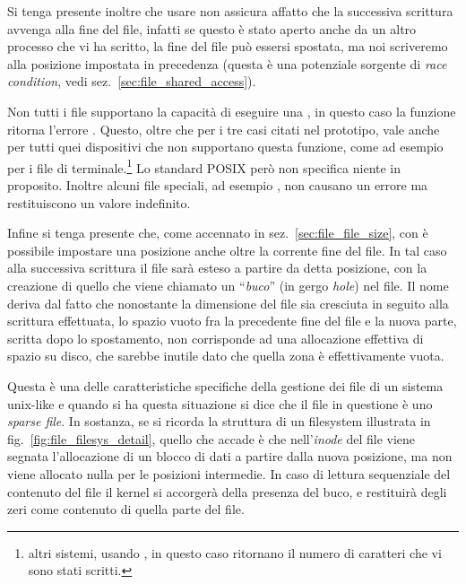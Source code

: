 
Si tenga presente inoltre che usare  non assicura affatto che
la successiva scrittura avvenga alla fine del file, infatti se questo è stato
aperto anche da un altro processo che vi ha scritto, la fine del file può
essersi spostata, ma noi scriveremo alla posizione impostata in precedenza
(questa è una potenziale sorgente di \textit{race condition}, vedi
sez.~\ref{sec:file_shared_access}).

Non tutti i file supportano la capacità di eseguire una , in
questo caso la funzione ritorna l'errore . Questo, oltre che
per i tre casi citati nel prototipo, vale anche per tutti quei dispositivi che
non supportano questa funzione, come ad esempio per i file di
terminale.\footnote{altri sistemi, usando , in questo caso
  ritornano il numero di caratteri che vi sono stati scritti.} Lo standard
POSIX però non specifica niente in proposito. Inoltre alcuni file speciali, ad
esempio , non causano un errore ma restituiscono un valore
indefinito.


Infine si tenga presente che, come accennato in sez.~\ref{sec:file_file_size},
con  è possibile impostare una posizione anche oltre la corrente
fine del file. In tal caso alla successiva scrittura il file sarà esteso a
partire da detta posizione, con la creazione di quello che viene chiamato un
``\textsl{buco}'' (in gergo \textit{hole}) nel file.  Il nome deriva dal fatto
che nonostante la dimensione del file sia cresciuta in seguito alla scrittura
effettuata, lo spazio vuoto fra la precedente fine del file e la nuova parte,
scritta dopo lo spostamento, non corrisponde ad una allocazione effettiva di
spazio su disco, che sarebbe inutile dato che quella zona è effettivamente
vuota.

Questa è una delle caratteristiche specifiche della gestione dei file di un
sistema unix-like e quando si ha questa situazione si dice che il file in
questione è uno \textit{sparse file}. In sostanza, se si ricorda la struttura
di un filesystem illustrata in fig.~\ref{fig:file_filesys_detail}, quello che
accade è che nell'\textit{inode} del file viene segnata l'allocazione di un
blocco di dati a partire dalla nuova posizione, ma non viene allocato nulla
per le posizioni intermedie. In caso di lettura sequenziale del contenuto del
file il kernel si accorgerà della presenza del buco, e restituirà degli zeri
come contenuto di quella parte del file.

